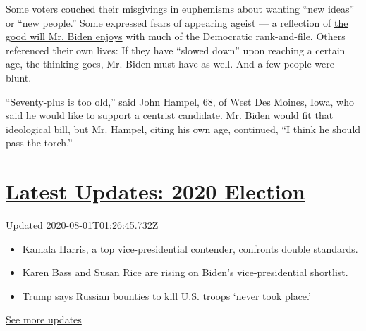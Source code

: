 Some voters couched their misgivings in euphemisms about wanting ``new
ideas'' or ``new people.'' Some expressed fears of appearing ageist ---
a reflection of
\href{https://www.nytimes.com/2019/04/28/us/politics/biden-pennsylvania-2020.html}{the
good will Mr. Biden enjoys} with much of the Democratic rank-and-file.
Others referenced their own lives: If they have ``slowed down'' upon
reaching a certain age, the thinking goes, Mr. Biden must have as well.
And a few people were blunt.

``Seventy-plus is too old,'' said John Hampel, 68, of West Des Moines,
Iowa, who said he would like to support a centrist candidate. Mr. Biden
would fit that ideological bill, but Mr. Hampel, citing his own age,
continued, ``I think he should pass the torch.''

\hypertarget{latest-updates-2020-election}{%
\section{\texorpdfstring{\href{https://www.nytimes.com/2020/07/31/us/elections/biden-vs-trump.html?action=click\&pgtype=Article\&state=default\&region=MAIN_CONTENT_1\&context=storylines_live_updates}{Latest
Updates: 2020
Election}}{Latest Updates: 2020 Election}}\label{latest-updates-2020-election}}

Updated 2020-08-01T01:26:45.732Z

\begin{itemize}
\tightlist
\item
  \href{https://www.nytimes.com/2020/07/31/us/elections/biden-vs-trump.html?action=click\&pgtype=Article\&state=default\&region=MAIN_CONTENT_1\&context=storylines_live_updates\#link-29fdff45}{Kamala
  Harris, a top vice-presidential contender, confronts double
  standards.}
\item
  \href{https://www.nytimes.com/2020/07/31/us/elections/biden-vs-trump.html?action=click\&pgtype=Article\&state=default\&region=MAIN_CONTENT_1\&context=storylines_live_updates\#link-13ec3d9c}{Karen
  Bass and Susan Rice are rising on Biden's vice-presidential
  shortlist.}
\item
  \href{https://www.nytimes.com/2020/07/31/us/elections/biden-vs-trump.html?action=click\&pgtype=Article\&state=default\&region=MAIN_CONTENT_1\&context=storylines_live_updates\#link-49e9a016}{Trump
  says Russian bounties to kill U.S. troops `never took place.'}
\end{itemize}

\href{https://www.nytimes.com/2020/07/31/us/elections/biden-vs-trump.html?action=click\&pgtype=Article\&state=default\&region=MAIN_CONTENT_1\&context=storylines_live_updates}{See
more updates}

